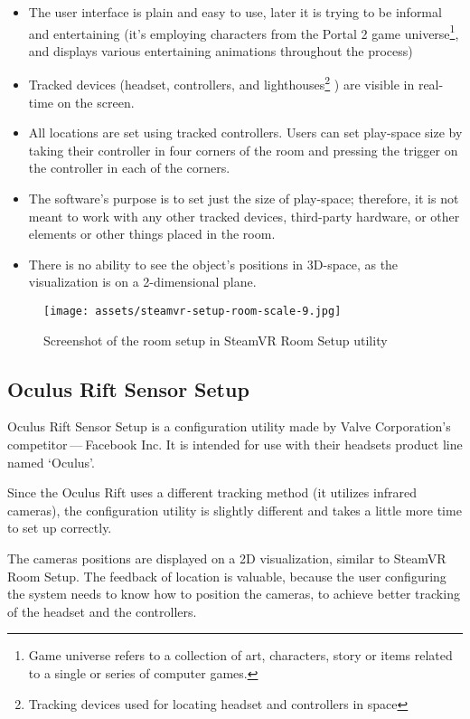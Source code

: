 \begin{itemize}
    \itemsep0em
\item The user interface is plain and easy to use, later it is trying to be informal
and entertaining (it’s employing characters from the Portal 2 game universe\footnote{Game universe refers to a collection of art, characters, story or items related to a single or series of computer games.},
and displays various entertaining animations throughout the process)
\item Tracked devices (headset, controllers, and lighthouses\footnote{Tracking devices used for locating headset and controllers in space}
) are visible in
real-time on the screen.
\item All locations are set using tracked controllers. Users can set play-space
size by taking their controller in four corners of the room and pressing
the trigger on the controller in each of the corners.
\item The software’s purpose is to set just the size of play-space; therefore, it is not
meant to work with any other tracked devices, third-party hardware, or other elements or
other things placed in the room.
\item There is no ability to see the object’s positions in 3D-space, as the visualization is
on a 2-dimensional plane.
\end{itemize}

\begin{figure}[h]{}
    \centering\texttt{[image: assets/steamvr-setup-room-scale-9.jpg]}
    \caption{Screenshot of the room setup in SteamVR Room Setup utility}
    \end{figure}
    
\hypertarget{x-oculus-rift-sensor-setup}{\subsection{Oculus Rift Sensor Setup}}
Oculus Rift Sensor Setup is a configuration utility made by Valve Corporation’s
competitor — Facebook Inc. It is intended for use with their headsets
product line named `Oculus'.

Since the Oculus Rift uses a different tracking method (it utilizes infrared cameras),
the configuration utility is slightly different and takes a little more
time to set up correctly.

The cameras positions are displayed on a 2D visualization, similar
to SteamVR Room Setup. The feedback of location is valuable, because the
user configuring the system needs to know how to position the
cameras, to achieve better tracking of the headset and the controllers.

